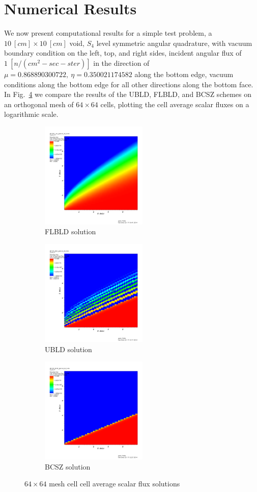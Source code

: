 \documentclass{mc2015}
\newcommand{\fig}[1]{Fig.~\ref{#1}}                      %
\begin{document}
\section{Numerical Results}
\label{sec:results}
We now present computational results for a simple test problem, a $10~[cm] \times 10~[cm]$ void, $S_4$ level symmetric angular quadrature,
with vacuum boundary condition on the left, top, and right sides, incident angular flux of $1~[n/(cm^2-sec-ster)]$ in the direction of $\mu=0.868890300722,~\eta = 0.350021174582$ along the bottom edge, vacuum conditions along the bottom edge for all other directions along the bottom face.
In \fig{fig:negatives} we compare the results of the UBLD, FLBLD, and BCSZ schemes on an orthogonal mesh of $64\times 64$ cells, plotting the cell average scalar fluxes on a logarithmic scale.
\begin{figure}[h]
	\begin{center}
		\begin{subfigure}{0.3\textwidth}
			\includegraphics[width=2in]{cb_64.png}
			\caption{FLBLD solution}
			\label{fig:scb_64}		
		\end{subfigure}
		\begin{subfigure}{0.3\textwidth}
			\includegraphics[width=2in]{bild_64.png}
			\caption{UBLD solution}
			\label{fig:bild_64}		
		\end{subfigure}
		\begin{subfigure}{0.3\textwidth}
			\includegraphics[width=2in]{bcsz_64.png}
			\caption{BCSZ solution}
			\label{fig:bcsz_64}		
		\end{subfigure}
	\end{center}
	\caption{$64\times 64$ mesh cell cell average scalar flux solutions}
	\label{fig:negatives}
\end{figure}
\end{document}
